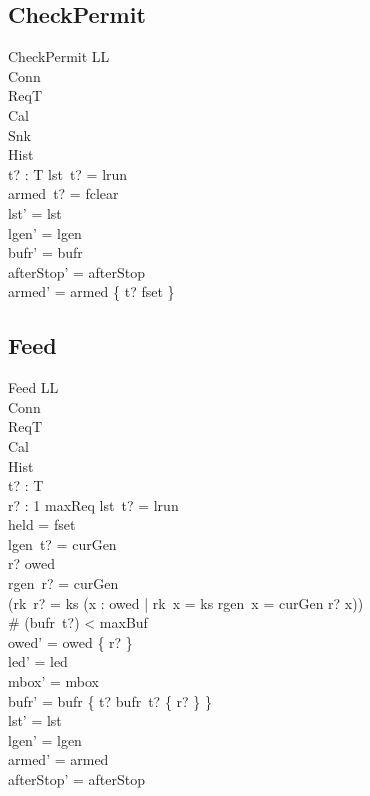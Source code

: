 \documentclass[a4paper,10pt,fleqn]{article}
\begin{document}
\subsection{CheckPermit}

\begin{schema}{CheckPermit}
  \Delta LL \\
  \Xi Conn \\
  \Xi ReqT \\
  \Xi Cal \\
  \Xi Snk \\
  \Xi Hist \\
  t? : T
\where
  lst~t? = lrun \\
  armed~t? = fclear \\
  lst' = lst \\
  lgen' = lgen \\
  bufr' = bufr \\
  afterStop' = afterStop \\
  armed' = armed \oplus \{ t? \mapsto fset \}
\end{schema}

\subsection{Feed}

\begin{schema}{Feed}
  \Delta LL \\
  \Xi Conn \\
  \Xi ReqT \\
  \Xi Cal \\
  \Xi Hist \\
  t? : T \\
  r? : 1 \upto maxReq
\where
  lst~t? = lrun \\
  held = fset \\
  lgen~t? = curGen \\
  r? \in owed \\
  rgen~r? = curGen \\
  (rk~r? = ks \implies
    (\forall x : owed | rk~x = ks \land rgen~x = curGen \spot r? \leq x)) \\
  \# (bufr~t?) < maxBuf \\
  owed' = owed \setminus \{ r? \} \\
  led' = led \\
  mbox' = mbox \\
  bufr' = bufr \oplus \{ t? \mapsto bufr~t? \cup \{ r? \} \} \\
  lst' = lst \\
  lgen' = lgen \\
  armed' = armed \\
  afterStop' = afterStop
\end{schema}
\end{document}
